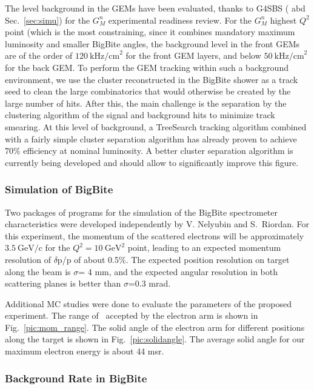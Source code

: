 The level background in the GEMs have been evaluated, thanks to G4SBS (\cite{g4sbs} abd Sec.~\ref{sec:simu}) for the $G_M^n$ experimental readiness review. %
For the $G_M^n$ highest $Q^2$ point (which is the most constraining, since it combines mandatory maximum luminosity and smaller BigBite angles, the background level in the front GEMs are of the order of $120~\mathrm{kHz/cm}^2$ for the front GEM layers, and below $50~\mathrm{kHz/cm}^2$ for the back GEM.
To perform the GEM tracking within such a background environment, we use the cluster reconstructed in the BigBite shower as a track seed to clean the large combinatorics that would otherwise be created by the large number of hits. After this, the main challenge is the separation by the clustering algorithm of the signal and background hits to minimize track smearing.
At this level of background, a TreeSearch tracking algorithm combined with a fairly simple cluster separation algorithm has already proven to achieve 70\% efficiency at nominal luminosity.
A better cluster separation algorithm is currently being developed and should allow to significantly improve this figure. 

\iffalse
\subsubsection{Simulation of BigBite}

Two packages of programs for the simulation of the BigBite spectrometer characteristics
were developed independently by V. Nelyubin \cite{nel01} and S.~Riordan.  
For this experiment, the momentum of the scattered electrons will be approximately $\mathrm{3.5~\mathrm{GeV/c}}$ for the $Q^2 = 10~\mathrm{GeV}^2$ point, 
leading to an expected momentum resolution of $\delta$p/p  of about 0.5\%.  
The expected position resolution on target
along the beam is $\sigma$= 4 mm, and the expected angular resolution in both 
scattering planes is better than $\sigma$=0.3 mrad.  

Additional MC studies were done to evaluate the parameters of the proposed experiment.  
The range of \qsq~accepted by the electron arm is shown in Fig.~\ref{pic:mom_range}. 
The solid angle of the electron arm for different positions along the target is shown in Fig.~\ref{pic:solidangle}.  
The average solid angle for our maximum electron energy is about 44 msr.
%

\subsubsection{Background Rate in BigBite}

